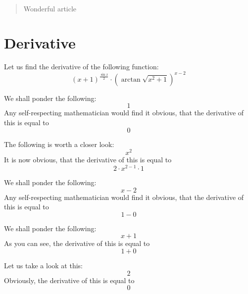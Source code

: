 \documentclass{article}
\begin{document}
\maketitle
\begin{abstract}
Wonderful article
\end{abstract}
\newpage
\section{Derivative}
Let us find the derivative of the following function:
\begin{equation}
\left( x + 1 \right) ^{\frac{\sin x }{2 } } \cdot \left( \arctan \sqrt {x ^{2 } + 1 } \right) ^{x - 2 } 
\end{equation}

We shall ponder the following:
\begin{equation}
1 
\end{equation}
Any self-respecting mathematician would find it obvious, that the derivative of this is equal to
\begin{equation}
0 
\end{equation}

The following is worth a closer look:
\begin{equation}
x ^{2 } 
\end{equation}
It is now obvious, that the derivative of this is equal to
\begin{equation}
2 \cdot x ^{2 - 1 } \cdot 1 
\end{equation}

We shall ponder the following:
\begin{equation}
x - 2 
\end{equation}
Any self-respecting mathematician would find it obvious, that the derivative of this is equal to
\begin{equation}
1 - 0 
\end{equation}

We shall ponder the following:
\begin{equation}
x + 1 
\end{equation}
As you can see, the derivative of this is equal to
\begin{equation}
1 + 0 
\end{equation}

Let us take a look at this:
\begin{equation}
2 
\end{equation}
Obviously, the derivative of this is equal to
\begin{equation}
0 
\end{equation}
\end{document}
